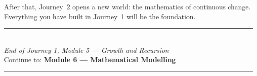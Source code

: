 \documentclass[12pt, a4paper]{article}
\begin{document}
After that, Journey~2 opens a new world: the mathematics of continuous change. Everything you have built in Journey~1 will be the foundation.

\vspace{1.4cm}
\begin{center}
{\color{MidBlue}\rule{0.5\linewidth}{0.8pt}}\\[6pt]
{\small\color{DarkGrey}\textit{End of Journey 1, Module 5 --- Growth and Recursion}}\\[4pt]
{\small\color{DarkGrey}Continue to: \textbf{Module 6 --- Mathematical Modelling}}\\[6pt]
{\color{MidBlue}\rule{0.5\linewidth}{0.8pt}}
\end{center}
\end{document}
